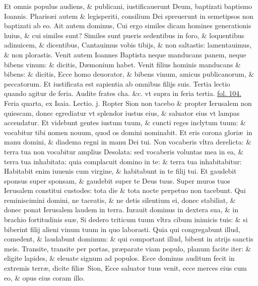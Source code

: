 \documentclass[a5paper,10pt]{book}
\def\rightmarginnote{%
	\lrmarginnote{\hskip\columnwidth \hskip -1em}}
\def\ae{æ}
\begin{document}
\begin{multicols*}{2}
Et omnis populus audiens, \& publicani, iustificauerunt Deum, baptizati baptismo Ioannis.
Pharis\ae i autem \& legisperiti, consilium Dei spreuerunt in semetipsos non baptizati ab eo.
Ait autem dominus, Cui ergo similes dicam homines generationis huius, \& cui similes sunt?
Similes sunt pueris sedentibus in foro, \& loquentibus adinuicem, \& dicentibus, Cantauimus vobis tibijs, \& non saltastis: lamentauimus, \& non plorastis.
Venit autem Ioannes Baptista neque manducans panem, neque bibens vinum: \& dicitis, D\ae monium habet.
Venit filius hominis manducans \& bibens: \& dicitis, Ecce homo deuorator, \& bibens vinum, amicus publicanorum, \& peccatorum.
Et iustificata est sapientia ab omnibus filijs suis.
\newline \color{red} Tertia lectio quando agitur de feria. \color{black} Audite frates cha. \&c. \color{red} vt supra in feria tertia. \hyperlink{page.104}{fol. 104.} \color{black}
\newline {} \color{red} \hypertarget{WED-TERTIA-ADV}{Feria quarta,} ex Isaia. \hfill Lectio. j. \color{black}
\vspace{-.25em}
Ropter\rightmarginnote{c. 62.} Sion non tacebo \& propter Ierusalem non quiescam, donec egrediatur vt splendor
iustus eius, \& saluator eius vt lampas accendatur.
Et videbunt gentes iustum tuum, \& cuncti reges inclytum tuum: \& vocabitur tibi nomen nouum, quod os domini nominabit.
Et eris corona glori\ae \ in manu domini, \& diadema regni in manu Dei tui.
Non vocaberis vltra derelicta: \& terra tua non vocabitur amplius Desolata: sed vocaberis voluntas mea in ea, \& terra tua inhabitata: quia complacuit domino in te: \& terra tua inhabitabitur: Habitabit enim iuuenis cum virgine, \& habitabunt in te filij tui.
Et gaudebit sponsus super sponsam, \& gaudebit super te Deus tuus.
Super muros tuos Ierusalem constitui custodes: tota die \& tota nocte perpetuo non tacebunt.
Qui reminiscimini domini, ne taceatis, \& ne detis silentium ei, donec stabiliat, \& donec ponat Ierusalem laudem in terra.
Iurauit dominus in dextera sua, \& in brachio fortitudinis su\ae , Si dedero triticum tuum vltra cibum inimicis tuis: \& si biberint filij alieni vinum tuum in quo laborasti.
Quia qui congregabunt illud, comedent, \& laudabunt dominum: \& qui comportant illud, bibent in atrijs sanctis meis.
Transite, transite per portas, pr\ae parate viam populo, planum facite iter: \& eligite lapides, \& eleuate signum ad populos.
Ecce dominus auditum fecit in extremis terr\ae , dicite fili\ae \ Sion, Ecce saluator tuus venit, ecce merces eius cum eo, \& opus eius coram illo.

\end{multicols*}
\end{document}
